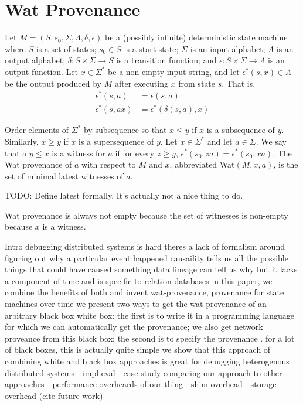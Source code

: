 \section{Wat Provenance}
\newcommand{\Wat}[1]{\textsf{Wat}$(#1)$}

Let $M = (S, s_0, \Sigma, \Lambda, \delta, \epsilon)$ be a (possibly
infinite) deterministic state machine where
  $S$ is a set of states;
  $s_0 \in S$ is a start state;
  $\Sigma$ is an input alphabet;
  $\Lambda$ is an output alphabet;
  $\delta: S \times \Sigma \to S$ is a transition function; and
  $\epsilon: S \times \Sigma \to \Lambda$ is an output function.
%
Let $x \in \Sigma^*$ be a non-empty input string, and let $\epsilon^*(s, x) \in
\Lambda$ be the output produced by $M$ after executing $x$ from state $s$.
That is,
\begin{align*}
  \epsilon^*(s, a)  &= \epsilon(s, a) \\
  \epsilon^*(s, ax) &= \epsilon^*(\delta(s, a), x)
\end{align*}

Order elements of $\Sigma^*$ by subsequence so that $x \leq y$ if $x$ is a
subsequence of $y$. Similarly, $x \geq y$ if $x$ is a supersequence of $y$.
Let $x \in \Sigma^*$ and let $a \in \Sigma$. We say that a $y \leq x$ is a
witness for $a$ if for every $z \geq y$, $\epsilon^*(s_0, za) = \epsilon^*(s_0,
xa)$. The Wat provenance of $a$ with respect to $M$ and $x$, abbreviated
\Wat{M, x, a}, is the set of minimal latest witnesses of $a$.

TODO: Define latest formally. It's actually not a nice thing to do.

Wat provenance is always not empty because the set of witnesses is non-empty
because $x$ is a witness.




Intro
  debugging distributed systems is hard
  theres a lack of formalism around figuring out why a particular event happened
  causaility tells us all the possible things that could have caused something
  data lineage can tell us why but it lacks a component of time and is specific to relation databases
  in this paper, we combine the benefits of both and invent wat-provenance, provenance for state machines over time
  we present two ways to get the wat provenance of an arbitrary black box
  white box: the first is to write it in a programming language for which we can automatically get the provenance; we also get network proveance from this
  black box: the second is to specify the provenance . for a lot of black boxes, this is actually quite simple
  we show that this approach of combining white and black box approaches is great for debugging heterogenous distributed systems
    - impl
  eval
    - case study comparing our approach to other approaches
    - performance overheards of our thing
      - shim overhead
      - storage overhead (cite future work)


